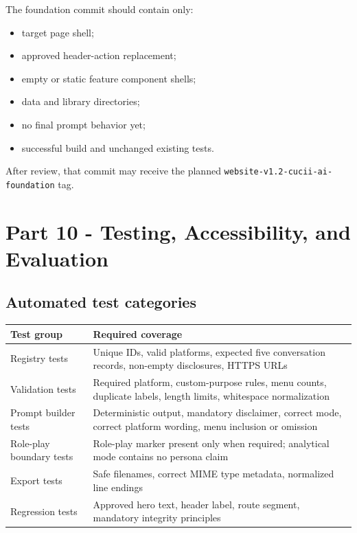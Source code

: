 \documentclass[11pt,letterpaper]{article}
\newcommand{\branchname}[1]{\texttt{#1}}
\begin{document}
The foundation commit should contain only:

\begin{itemize}
    \item target page shell;
    \item approved header-action replacement;
    \item empty or static feature component shells;
    \item data and library directories;
    \item no final prompt behavior yet;
    \item successful build and unchanged existing tests.
\end{itemize}

After review, that commit may receive the planned
\branchname{website-v1.2-cucii-ai-foundation} tag.

\section{Part 10 - Testing, Accessibility, and Evaluation}

\subsection{Automated test categories}

\begin{tabularx}{\textwidth}{L{2.05in}Y}
\toprule
\textbf{Test group} & \textbf{Required coverage} \\
\midrule
Registry tests & Unique IDs, valid platforms, expected five conversation records, non-empty disclosures, HTTPS URLs \\
Validation tests & Required platform, custom-purpose rules, menu counts, duplicate labels, length limits, whitespace normalization \\
Prompt builder tests & Deterministic output, mandatory disclaimer, correct mode, correct platform wording, menu inclusion or omission \\
Role-play boundary tests & Role-play marker present only when required; analytical mode contains no persona claim \\
Export tests & Safe filenames, correct MIME type metadata, normalized line endings \\
Regression tests & Approved hero text, header label, route segment, mandatory integrity principles \\
\bottomrule
\end{tabularx}
\end{document}
